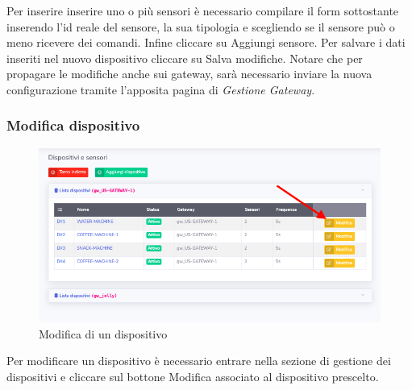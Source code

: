 		Per inserire inserire uno o più sensori è necessario compilare il form sottostante inserendo l'id reale del sensore, la sua tipologia e scegliendo se il sensore può o meno ricevere dei comandi. Infine cliccare su Aggiungi sensore.
		Per salvare i dati inseriti nel nuovo dispositivo cliccare su Salva modifiche.
		Notare che per propagare le modifiche anche sui gateway, sarà necessario inviare la nuova configurazione tramite l'apposita pagina di \textit{Gestione Gateway}.

	\subsubsection{Modifica dispositivo}

		\begin{figure}[H]
		\centering
		\includegraphics[scale=0.600]{res/images/admin/selModDisp.png}
		\caption{Modifica di un dispositivo}
	\end{figure}

		Per modificare un dispositivo è necessario entrare nella sezione di gestione dei dispositivi e cliccare sul bottone Modifica associato al dispositivo prescelto.

